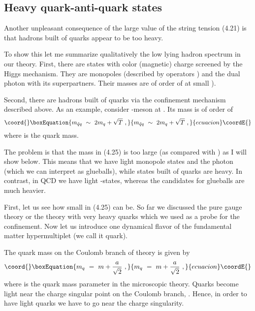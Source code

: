 \documentclass[a4paper,12pt]{article}
\begin{document}
\subsection{Heavy quark-anti-quark states}

Another unpleasant consequence of the large value of the string
tension (4.21) is that hadrons built of quarks appear to be too
heavy.

To show this let me summarize qualitatively the low lying hadron
spectrum in our theory. First,  there are states with color
(magnetic) charge screened by the Higgs mechanism. They are
monopoles (described by operators
\coordHE{}) and the dual photon with its superpartners.
Their masses are of order of \coordHE{}  \coordHE{}
at small \myHighlight{$\mu $}\coordHE{}).

Second, there are hadrons built of quarks via the confinement
mechanism described above. As an example, consider
 \coordHE{}-meson at \coordHE{}. Its mass is of order of
\begin{equation}\coord{}\boxEquation{
m_{\tilde qq}\ \sim\ 2m_q+\sqrt T\ ,
}{
m_{\tilde qq}\ \sim\ 2m_q+\sqrt T\ ,
}{ecuacion}\coordE{}\end{equation}
where \coordHE{} is the quark mass.

The problem is that the mass in (4.25) is too large (as compared with
\coordHE{}) as I will show below. This means that we have
light monopole states and the photon (which we can
interpret  as glueballs), while states built of quarks are
heavy.  In contrast, in QCD we have light \coordHE{}-states,
whereas the candidates for glueballs are much heavier.

First, let us see how small \coordHE{} in (4.25) can be. So far
we  discussed the pure gauge theory or the theory with very
heavy quarks which we used as a probe for the confinement. Now
let us introduce one dynamical flavor  of the
fundamental matter hypermultiplet
\cite{SW2}(we call it quark).

The quark mass on the Coulomb branch of \coordHE{} theory is given by
\begin{equation}\coord{}\boxEquation{
m_q\ =\ m+\frac a{\sqrt2}\ ,
}{
m_q\ =\ m+\frac a{\sqrt2}\ ,
}{ecuacion}\coordE{}\end{equation}
where \coordHE{} is the quark mass parameter in the microscopic theory.
Quarks become light near the charge singular point on the
Coulomb branch, \coordHE{}. Hence, in order to have light
quarks we have to go near the charge singularity.
\end{document}
